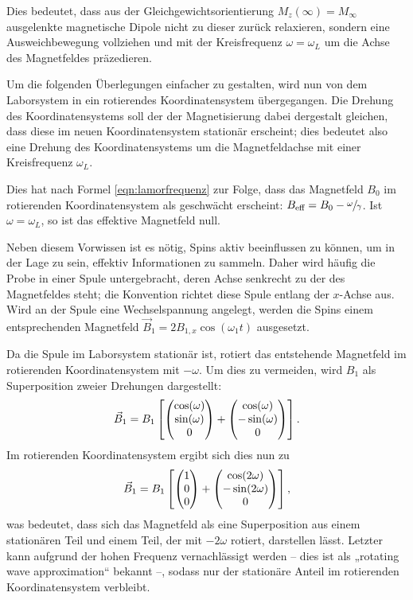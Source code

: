 Dies bedeutet, dass aus der Gleichgewichtsorientierung $M_z(\infty) = M_\infty$ ausgelenkte magnetische Dipole nicht zu dieser zurück relaxieren, sondern eine Ausweichbewegung vollziehen und mit der Kreisfrequenz $\omega = \omega_L$ um die Achse des Magnetfeldes präzedieren.

Um die folgenden Überlegungen einfacher zu gestalten, wird nun von dem Laborsystem in ein rotierendes Koordinatensystem übergegangen. Die Drehung des Koordinatensystems soll der der Magnetisierung dabei dergestalt gleichen, dass diese im neuen Koordinatensystem stationär erscheint; dies bedeutet also eine Drehung des Koordinatensystems um die Magnetfeldachse mit einer Kreisfrequenz $\omega_L$.

Dies hat nach Formel \eqref{eqn:lamorfrequenz} zur Folge, dass das Magnetfeld $B_0$ im rotierenden Koordinatensystem als geschwächt erscheint: $B_\text{eff} = B_0 - \sfrac{\omega}{\gamma}$. Ist $\omega = \omega_L$, so ist das effektive Magnetfeld null.


Neben diesem Vorwissen ist es nötig, Spins aktiv beeinflussen zu können, um in der Lage zu sein, effektiv Informationen zu sammeln. Daher wird häufig die Probe in einer Spule untergebracht, deren Achse senkrecht zu der des Magnetfeldes steht; die Konvention richtet diese Spule entlang der $x$-Achse aus. Wird an der Spule eine Wechselspannung angelegt, werden die Spins einem entsprechenden Magnetfeld $\vec{B}_1 = 2 B_{1,x} \cos(\omega_1 t)$ ausgesetzt.

Da die Spule im Laborsystem stationär ist, rotiert das entstehende Magnetfeld im rotierenden Koordinatensystem mit $-\omega$. Um dies zu vermeiden, wird $B_1$ als Superposition zweier Drehungen dargestellt:
\begin{align}
    \vec{B}_1 = B_1 \left[ \begin{pmatrix}\cos(\omega) \\ \sin(\omega) \\ 0\end{pmatrix} + 
                      \begin{pmatrix}\cos(\omega) \\ -\sin(\omega) \\ 0\end{pmatrix} \right].
\end{align}
Im rotierenden Koordinatensystem ergibt sich dies nun zu
\begin{align}
    \vec{B}_1 = B_1 \left[ \begin{pmatrix}1 \\ 0 \\ 0\end{pmatrix} + 
                      \begin{pmatrix}\cos(2\omega) \\ -\sin(2\omega) \\ 0\end{pmatrix} \right],
\end{align}
was bedeutet, dass sich das Magnetfeld als eine Superposition aus einem stationären Teil und einem Teil, der mit $-2\omega$ rotiert, darstellen lässt. Letzter kann aufgrund der hohen Frequenz vernachlässigt werden -- dies ist als „rotating wave approximation“ bekannt --, sodass nur der stationäre Anteil im rotierenden Koordinatensystem verbleibt.

